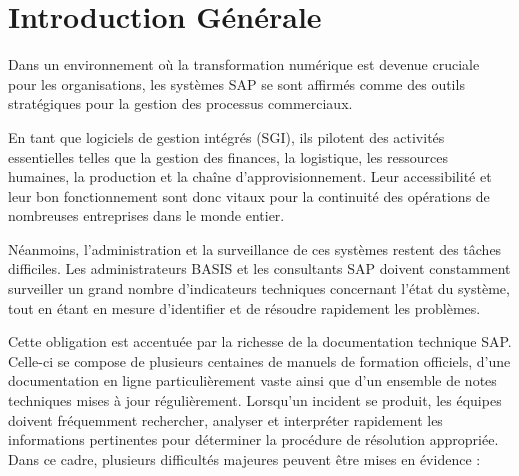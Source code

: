 
\chapter*{Introduction Générale}
\label{chap:intro_generale}

Dans un environnement où la transformation numérique est devenue cruciale pour les organisations, les systèmes SAP se sont affirmés comme des outils stratégiques pour la gestion des processus commerciaux.

En tant que logiciels de gestion intégrés (SGI), ils pilotent des activités essentielles telles que la gestion des finances, la logistique, les ressources humaines, la production et la chaîne d'approvisionnement. Leur accessibilité et leur bon fonctionnement sont donc vitaux pour la continuité des opérations de nombreuses entreprises dans le monde entier.

Néanmoins, l'administration et la surveillance de ces systèmes restent des tâches difficiles. Les administrateurs BASIS et les consultants SAP doivent constamment surveiller un grand nombre d'indicateurs techniques concernant l'état du système, tout en étant en mesure d'identifier et de résoudre rapidement les problèmes.

Cette obligation est accentuée par la richesse de la documentation technique SAP. Celle-ci se compose de plusieurs centaines de manuels de formation officiels, d'une documentation en ligne particulièrement vaste ainsi que d'un ensemble de notes techniques mises à jour régulièrement. Lorsqu'un incident se produit, les équipes doivent fréquemment rechercher, analyser et interpréter rapidement les informations pertinentes pour déterminer la procédure de résolution appropriée.
 Dans ce cadre, plusieurs difficultés majeures peuvent être mises en évidence :

